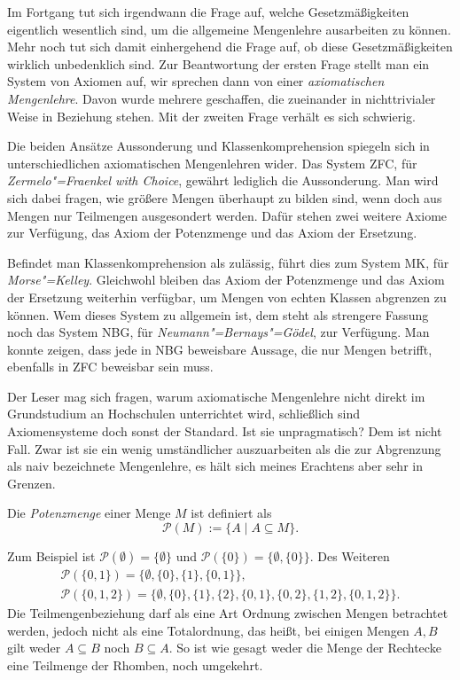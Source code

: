 Im Fortgang tut sich irgendwann die Frage auf, welche Gesetzmäßigkeiten
eigentlich wesentlich sind, um die allgemeine Mengenlehre ausarbeiten
zu können. Mehr noch tut sich damit einhergehend die Frage auf, ob diese
Gesetzmäßigkeiten wirklich unbedenklich sind. Zur Beantwortung der
ersten Frage stellt man ein System von Axiomen auf, wir sprechen dann
von einer \emph{axiomatischen Mengenlehre}. Davon wurde mehrere
geschaffen, die zueinander in nichttrivialer Weise in Beziehung stehen.
Mit der zweiten Frage verhält es sich schwierig.

Die beiden Ansätze Aussonderung und Klassenkomprehension spiegeln
sich in unterschiedlichen axiomatischen Mengenlehren wider. Das
System ZFC, für \emph{Zermelo"=Fraenkel with Choice}, gewährt lediglich
die Aussonderung. Man wird sich dabei fragen, wie größere Mengen
überhaupt zu bilden sind, wenn doch aus Mengen nur Teilmengen ausgesondert
werden. Dafür stehen zwei weitere Axiome zur Verfügung, das Axiom der
Potenzmenge und das Axiom der Ersetzung.

Befindet man Klassenkomprehension als zulässig, führt dies zum
System MK, für \emph{Morse"=Kelley}. Gleichwohl bleiben das Axiom der
Potenzmenge und das Axiom der Ersetzung weiterhin verfügbar, um Mengen
von echten Klassen abgrenzen zu können. Wem dieses System zu allgemein
ist,  dem steht als strengere Fassung noch das System NBG, für
\emph{Neumann"=Bernays"=Gödel}, zur Verfügung. Man konnte zeigen,
dass jede in NBG beweisbare Aussage, die nur Mengen betrifft,
ebenfalls in ZFC beweisbar sein muss.

Der Leser mag sich fragen, warum axiomatische Mengenlehre
nicht direkt im Grundstudium an Hochschulen unterrichtet wird,
schließlich sind Axiomensysteme doch sonst der Standard. Ist sie
unpragmatisch? Dem ist nicht Fall. Zwar ist sie ein wenig umständlicher
auszuarbeiten als die zur Abgrenzung als naiv bezeichnete Mengenlehre,
es hält sich meines Erachtens aber sehr in Grenzen.

\begin{Definition}[Potenzmenge]\newlinefirst
Die \emph{Potenzmenge} einer Menge $M$ ist definiert als
\[\mathcal P(M) := \{A\mid A\subseteq M\}.\]
\end{Definition}
Zum Beispiel ist $\mathcal P(\emptyset) = \{\emptyset\}$ und
$\mathcal P(\{0\}) = \{\emptyset, \{0\}\}$. Des Weiteren
\begin{gather*}
\mathcal P(\{0,1\}) = \{\emptyset, \{0\}, \{1\}, \{0,1\}\},\\
\mathcal P(\{0,1,2\}) = \{\emptyset, \{0\}, \{1\}, \{2\}, \{0,1\}, \{0,2\}, \{1,2\}, \{0,1,2\}\}.
\end{gather*}
Die Teilmengenbeziehung darf als eine Art Ordnung zwischen Mengen
betrachtet werden, jedoch nicht als eine Totalordnung, das heißt,
bei einigen Mengen $A,B$ gilt weder $A\subseteq B$ noch $B\subseteq A$.
So ist wie gesagt weder die Menge der Rechtecke eine Teilmenge der
Rhomben, noch umgekehrt.

